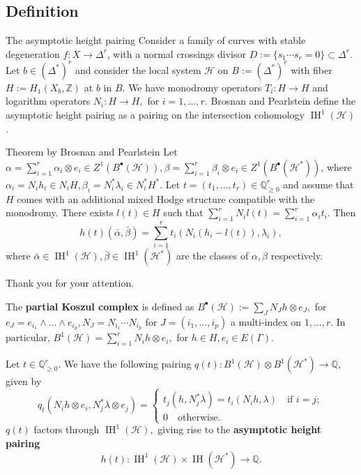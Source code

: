 \documentclass{beamer}
\newcommand{\numberset}{\mathbb}
\newcommand{\Z}{\numberset{Z}}
\newcommand{\Q}{\numberset{Q}}
\DeclareMathOperator{\IH}{IH}
\begin{document}
\subsection{Definition}
\begin{frame}{The asymptotic height pairing}
Consider a family of curves with stable degeneration $f \colon X \rightarrow \Delta^r$, with a normal crossings divisor $D:=\{s_1 \cdots s_r =0\} \subset \Delta^r$. Let $b \in (\Delta^*)^r$ and consider the local system $\mathcal{H}$ on $B:= (\Delta^*)^r$ with fiber $H:= H_1(X_{b},\Z)$ at $b$ in $B$. We have monodromy operators $T_i \colon H \rightarrow H$ and logarithm operators $N_i \colon H \rightarrow H,$ for $i=1, \dots, r.$ Brosnan and Pearlstein define the asymptotic height pairing as a pairing on the intersection cohomology $\IH^1(\mathcal{H})$.
\end{frame}

\begin{frame}
\begin{block}{Theorem by Brosnan and Pearlstein}
	Let $\alpha = \sum_{i=1}^r\alpha_i \otimes e_i \in Z^1(B^\bullet(\mathcal{H})), \beta= \sum_{i=1}^r \beta_i \otimes e_i \in Z^1(B^\bullet(\mathcal{H}^*))$, where $\alpha_i = N_i h_i \in N_i H, \beta_i = N_i^*\lambda_i \in N_i^*H^*.$ Let $t=(t_1,\dots,t_r) \in \Q^r_{\ge 0}$ and assume that $H$ comes with an additional mixed Hodge structure compatible with the monodromy. There exists $l(t) \in H$ such that $\sum_{i=1}^r N_il(t) = \sum_{i=1}^r\alpha_i t_i$. Then $$h(t)(\bar{\alpha}, \bar{\beta}) = \sum_{i=1}^r t_i (N_i(h_i-l(t)), \lambda_i),$$ where $\bar{\alpha}\in \IH^1(\mathcal{H}), \bar{\beta} \in \IH^1(\mathcal{H}^*)$ are the classes of $\alpha,\beta$ respectively.
\end{block}
\end{frame}

\begin{frame}
\centering
\Large{Thank you for your attention.}
\end{frame}

\begin{frame}
The \textbf{partial Koszul complex} is defined as $B^\bullet(\mathcal{H}):= \sum_{J} N_J h \otimes e_J,$ for $e_J = e_{i_1} \wedge \dots \wedge e_{i_p}, N_J=N_{i_1} \cdots N_{i_p}$ for $J=(i_1, \dots,i_p)$ a multi-index on $1, \dots, r.$ In particular, $B^1(\mathcal{H}) = \sum_{i=1}^r N_ih \otimes e_i,$ for $h \in H, e_i \in E(\Gamma).$ 
\end{frame}

\begin{frame}
Let $t \in \Q^r_{\ge 0}$. We have the following pairing $q(t) \colon B^1(\mathcal{H}) \otimes B^1(\mathcal{H}^*) \rightarrow \Q$, given by $$q_t(N_i h \otimes e_i, N_j^* \lambda \otimes e_j) = \begin{cases}
t_j(h, N_j^*\lambda) = t_i(N_ih, \lambda) \quad \text{if } i=j;\\ 0 \quad \text{otherwise}.
\end{cases}$$
$q(t)$ factors through $\IH^1(\mathcal{H}),$ giving rise to the \textbf{asymptotic height pairing} $$h(t) \colon \IH^1(\mathcal{H}) \times \IH(\mathcal{H}^*) \rightarrow \Q.$$
\end{frame}
\end{document}
